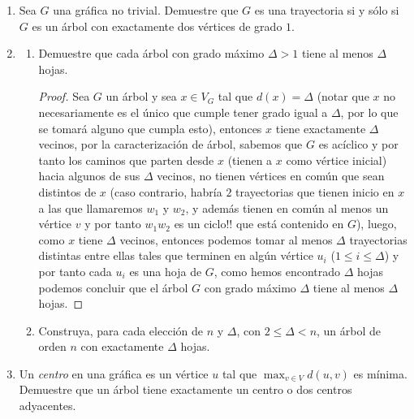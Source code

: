 \documentclass{article}
\begin{document}
\begin{enumerate}
  \item Sea $G$ una gr\'afica no trivial.   Demuestre
    que $G$ es una trayectoria si y s\'olo si $G$ es
    un \'arbol con exactamente dos v\'ertices de
    grado $1$.
    
  \item \begin{enumerate}
    \item Demuestre que cada \'arbol con grado m\'aximo
      $\Delta > 1$ tiene al menos $\Delta$ hojas.
      \renewcommand\qedsymbol{QED}
      \begin{proof}
      Sea $G$ un \'arbol y sea $x \in V_G$ tal que $d(x) = \Delta$ (notar que $x$
      no necesariamente es el \'unico que cumple tener grado igual a $\Delta$, por
      lo que se tomar\'a alguno que cumpla esto), entonces $x$ tiene exactamente
      $\Delta$ vecinos, por la caracterizaci\'on de \'arbol, sabemos que $G$ es
      ac\'iclico y por tanto los caminos que parten desde $x$ (tienen a $x$
      como v\'ertice inicial) hacia algunos de sus $\Delta$ vecinos, no tienen
      v\'ertices en com\'un que sean distintos de $x$ (caso contrario, habr\'ia $2$
      trayectorias que tienen inicio en $x$ a las que llamaremos $w_1$ y $w_2$, y
      adem\'as tienen en com\'un al menos un v\'ertice $v$ y por tanto $w_1 w_2$ es
      un ciclo!! que est\'a contenido en $G$), luego, como $x$ tiene $\Delta$ vecinos,
      entonces podemos tomar al menos $\Delta$ trayectorias distintas entre ellas
      tales que terminen en alg\'un v\'ertice $u_i$ ($1 \leq i \leq \Delta$) y por
      tanto cada $u_i$ es una hoja de $G$, como hemos encontrado $\Delta$ hojas
      podemos concluir que el \'arbol $G$ con grado m\'aximo $\Delta$ tiene al menos
      $\Delta$ hojas.
      \end{proof}
    \item Construya, para cada elecci\'on de $n$ y $\Delta$,
      con $2\le \Delta < n$, un \'arbol de orden $n$ con
      exactamente $\Delta$ hojas.
  \end{enumerate}
    
  \item Un {\em centro} en una gr\'afica es un v\'ertice
    $u$ tal que $\max_{v \in V} d(u, v)$ es m\'inima.
    Demuestre que un \'arbol tiene exactamente un centro
    o dos centros adyacentes.
    

\end{enumerate}
\end{document}
